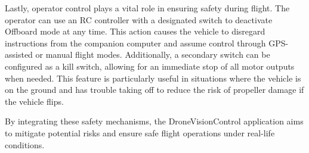 Lastly, operator control plays a vital role in ensuring safety during flight. The operator can use an RC controller with a designated switch to deactivate Offboard mode at any time. This action causes the vehicle to disregard instructions from the companion computer and assume control through GPS-assisted or manual flight modes. Additionally, a secondary switch can be configured as a kill switch, allowing for an immediate stop of all motor outputs when needed. This feature is particularly useful in situations where the vehicle is on the ground and has trouble taking off to reduce the risk of propeller damage if the vehicle flips.

By integrating these safety mechanisms, the DroneVisionControl application aims to mitigate potential risks and ensure safe flight operations under real-life conditions.